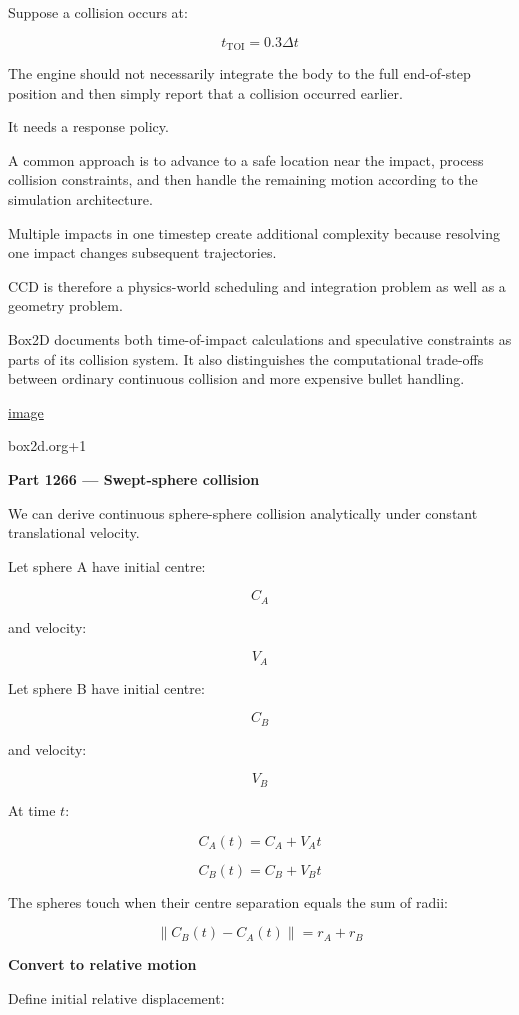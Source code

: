 Suppose a collision occurs at:

\[
t_{\mathrm{TOI}}=0.3\Delta t
\]

The engine should not necessarily integrate the body to the full end-of-step position and then simply report that a collision occurred earlier.

It needs a response policy.

A common approach is to advance to a safe location near the impact, process collision constraints, and then handle the remaining motion according to the simulation architecture.

Multiple impacts in one timestep create additional complexity because resolving one impact changes subsequent trajectories.

CCD is therefore a physics-world scheduling and integration problem as well as a geometry problem.

Box2D documents both time-of-impact calculations and speculative constraints as parts of its collision system. It also distinguishes the computational trade-offs between ordinary continuous collision and more expensive bullet handling. 

\href{https://www.google.com/s2/favicons?domain=https://box2d.org&sz=32}{image}

box2d.org+1

\textbf{Part 1266 --- Swept-sphere collision}

We can derive continuous sphere-sphere collision analytically under constant translational velocity.

Let sphere A have initial centre:

\[
C_A
\]

and velocity:

\[
V_A
\]

Let sphere B have initial centre:

\[
C_B
\]

and velocity:

\[
V_B
\]

At time \(t\):

\[
C_A(t)=C_A+V_At
\]

\[
C_B(t)=C_B+V_Bt
\]

The spheres touch when their centre separation equals the sum of radii:

\[
\boxed{ \|C_B(t)-C_A(t)\|=r_A+r_B }
\]

\textbf{Convert to relative motion}

Define initial relative displacement:

